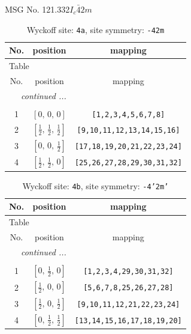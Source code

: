 \documentclass[fleqn,8pt]{jsarticle}
\begin{document}
\setcounter{MaxMatrixCols}{32}

\renewcommand{\tablename}{Table~}
\renewcommand{\figurename}{Figure~}
\begin{center}
\LARGE
MSG No. 121.332\quad$I_{c}\bar{4}2m$
\end{center}
\renewcommand{\arraystretch}{1.2}
\begin{longtable}{ccc}
\caption{Wyckoff site: {\tt 4a}, site symmetry: {\tt -42m}}
 \\
 \hline \hline
No. & position & mapping \\ \hline \endfirsthead

\multicolumn{2}{l}{\tablename\ \thetable{}} \\
 \hline \hline
No. & position & mapping \\ \hline \endhead

 \hline \hline
\multicolumn{2}{r}{\footnotesize\it continued ...} \\ \endfoot

 \hline \hline
\multicolumn{2}{r}{} \\ \endlastfoot

1 & $\left[ 0,\, 0,\, 0 \right]$ & {\tt [1,2,3,4,5,6,7,8]} \\ \hline
2 & $\left[ \frac{1}{2},\, \frac{1}{2},\, \frac{1}{2} \right]$ & {\tt [9,10,11,12,13,14,15,16]} \\ \hline
3 & $\left[ 0,\, 0,\, \frac{1}{2} \right]$ & {\tt [17,18,19,20,21,22,23,24]} \\ \hline
4 & $\left[ \frac{1}{2},\, \frac{1}{2},\, 0 \right]$ & {\tt [25,26,27,28,29,30,31,32]} \\
\end{longtable}
\renewcommand{\arraystretch}{1.2}
\begin{longtable}{ccc}
\caption{Wyckoff site: {\tt 4b}, site symmetry: {\tt -4'2m'}}
 \\
 \hline \hline
No. & position & mapping \\ \hline \endfirsthead

\multicolumn{2}{l}{\tablename\ \thetable{}} \\
 \hline \hline
No. & position & mapping \\ \hline \endhead

 \hline \hline
\multicolumn{2}{r}{\footnotesize\it continued ...} \\ \endfoot

 \hline \hline
\multicolumn{2}{r}{} \\ \endlastfoot

1 & $\left[ 0,\, \frac{1}{2},\, 0 \right]$ & {\tt [1,2,3,4,29,30,31,32]} \\ \hline
2 & $\left[ \frac{1}{2},\, 0,\, 0 \right]$ & {\tt [5,6,7,8,25,26,27,28]} \\ \hline
3 & $\left[ \frac{1}{2},\, 0,\, \frac{1}{2} \right]$ & {\tt [9,10,11,12,21,22,23,24]} \\ \hline
4 & $\left[ 0,\, \frac{1}{2},\, \frac{1}{2} \right]$ & {\tt [13,14,15,16,17,18,19,20]} \\
\end{longtable}
\end{document}

